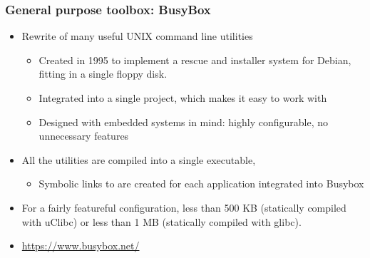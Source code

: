 \begin{frame}
  \frametitle{General purpose toolbox: BusyBox}
  \begin{itemize}
  \item Rewrite of many useful UNIX command line utilities
    \begin{itemize}
    \item Created in 1995 to implement a rescue and installer
     system for Debian, fitting in a single floppy disk.
    \item Integrated into a single project, which makes it easy to
      work with
    \item Designed with embedded systems in mind: highly configurable,
      no unnecessary features
    \end{itemize}
  \item All the utilities are compiled into a single executable,
    \begin{itemize}
    \item Symbolic links to  are created for each
      application integrated into Busybox
    \end{itemize}
  \item For a fairly featureful configuration, less than 500 KB
    (statically compiled with uClibc) or less than 1 MB (statically
    compiled with glibc).
  \item   \url{https://www.busybox.net/}
  \end{itemize}
\end{frame}

